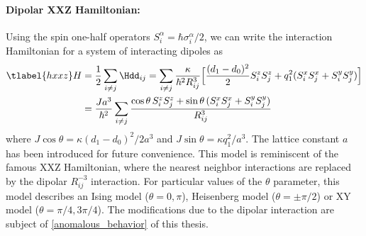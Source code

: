 \paragraph{Dipolar XXZ Hamiltonian:}
Using the spin one-half operators $S^\alpha_i = \hbar \sigma^\alpha_i/2$, we can write the interaction Hamiltonian for a system of interacting dipoles as
\begin{align} \tlabel{hxxz}
    H &= \frac{1}{2} \sum_{i\ne j} \Hdd_{ij} = \sum_{i\ne j} \frac{\kappa}{\hbar^2 R_{ij}^3} \Big[ \frac{(d_1-d_0)^2}{2} S^z_i S^z_j  + q_1^2 (S^x_i S^x_j + S^y_i S^y_j) \Big] \\
         &= \frac{Ja^3}{\hbar^2} \sum_{i\ne j} \frac{\cos\theta\, S^z_i S^z_j  + \sin\theta\, (S^x_i S^x_j + S^y_i S^y_j)}{R_{ij}^3}
\end{align}
where $J\cos\theta = \kappa (d_1-d_0)^2/2a^3$ and $J\sin\theta = \kappa q_1^2/a^3$. The lattice constant $a$ has been introduced for future convenience.
This model is reminiscent of the famous XXZ Hamiltonian, where the nearest neighbor interactions are replaced by the dipolar $R_{ij}^{-3}$ interaction. For particular values of the $\theta$ parameter, this model describes an Ising model ($\theta = 0, \pi$), Heisenberg model ($\theta=\pm \pi/2$) or XY model ($\theta=\pi/4, 3\pi/4$). The modifications due to the dipolar interaction are subject of \cref{anomalous_behavior} of this thesis.

